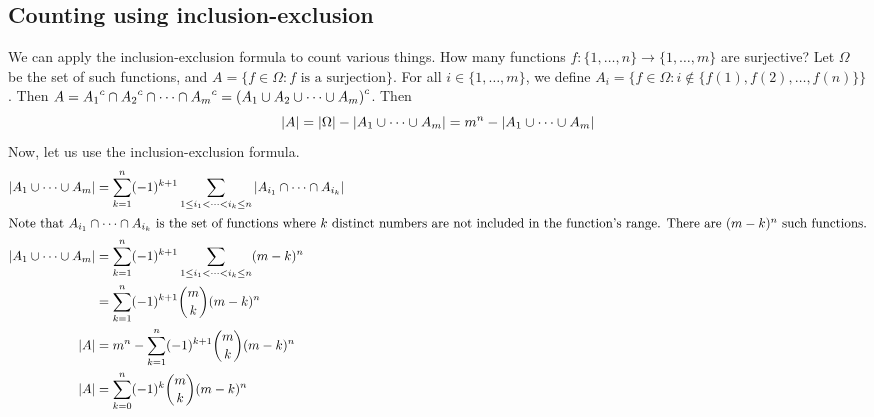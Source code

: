 \subsection{Counting using inclusion-exclusion}
We can apply the inclusion-exclusion formula to count various things.
How many functions \(f \colon \{ 1, \dots, n \} \to \{ 1, \dots, m \}\) are surjective?
Let \(\Omega\) be the set of such functions, and \(A = \{ f \in \Omega : f \text{ is a surjection} \}\).
For all \(i \in \{ 1, \dots, m \}\), we define \(A_i = \{ f \in \Omega : i \notin \{ f(1), f(2), \dots, f(n) \} \}\).
Then \(A = {A_1}^c \cap {A_2}^c \cap \dots \cap {A_m}^c = {(A_1 \cup A_2 \cup \dots \cup A_m)}^c\).
Then
\[
	\abs{A} = \abs{\Omega} - \abs{A_1 \cup \dots \cup A_m} = m^n - \abs{A_1 \cup \dots \cup A_m}
\]
Now, let us use the inclusion-exclusion formula.
\begin{align*}
	\abs{A_1 \cup \dots \cup A_m} & = \sum_{k=1}^n (-1)^{k+1} \sum_{1 \leq i_1 < \dots < i_k \leq n} \abs{A_{i_1} \cap \dots \cap A_{i_k}} \\
	\intertext{Note that \(A_{i_1} \cap \dots \cap A_{i_k}\) is the set of functions where \(k\) distinct numbers are not included in the function's range.
		There are \((m-k)^n\) such functions.}
	\abs{A_1 \cup \dots \cup A_m} & = \sum_{k=1}^n (-1)^{k+1} \sum_{1 \leq i_1 < \dots < i_k \leq n} (m-k)^n                               \\
	                              & = \sum_{k=1}^n (-1)^{k+1} \binom{m}{k} (m-k)^n                                                         \\
	\abs{A}                       & = m^n -  \sum_{k=1}^n (-1)^{k+1} \binom{m}{k} (m-k)^n                                                  \\
	\abs{A}                       & = \sum_{k=0}^n (-1)^k \binom{m}{k} (m-k)^n
\end{align*}

